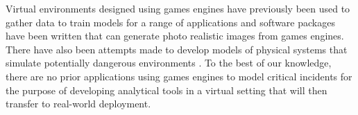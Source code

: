 Virtual environments designed using games engines have previously been used to gather data to train models for a range of applications \cite{1608.02192}\cite{uav_benchmark_simulator} and software packages have been written that can generate photo realistic images from games engines\cite{1609.01326}. There have also been attempts made to develop models of physical systems that simulate potentially dangerous environments \cite{4625089}. To the best of our knowledge, there are no prior applications using games engines to model critical incidents for the purpose of developing analytical tools in a virtual setting that will then transfer to real-world deployment.